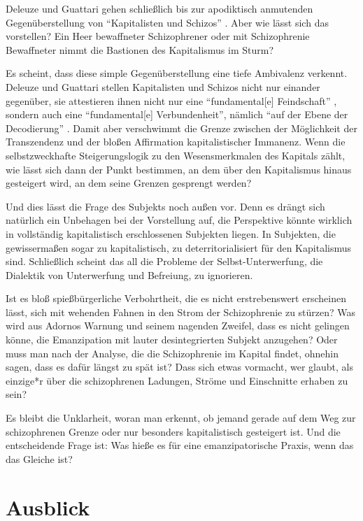 \documentclass[12pt,
               paper=a4,
               twoside=false,
               onehalfspacing,
               bibliography=totoc,
               toc=graduated,
               ]{scrartcl}
\newcommand{\pc}[2]{\parencite[#1]{#2}}
\newcommand{\dg}{Deleuze und Guattari\xspace}
\begin{document}
\dg gehen schließlich bis zur apodiktisch anmutenden Gegenüberstellung
von "`Kapitalisten und Schizos"' \pc{328}{ao}. Aber wie lässt sich das
vorstellen? Ein Heer bewaffneter Schizophrener oder mit Schizophrenie
Bewaffneter nimmt die Bastionen des Kapitalismus im Sturm?

Es scheint, dass diese simple Gegenüberstellung eine tiefe Ambivalenz
verkennt. \dg stellen Kapitalisten und Schizos nicht nur einander
gegenüber, sie attestieren ihnen nicht nur eine "`fundamental[e]
Feindschaft"' \pc{328}{ao}, sondern auch eine "`fundamental[e]
Verbundenheit"', nämlich "`auf der Ebene der Decodierung"'
\pc{328}{ao}. Damit aber verschwimmt die Grenze zwischen der
Möglichkeit der Transzendenz und der bloßen Affirmation
kapitalistischer Immanenz.
Wenn die selbstzweckhafte Steigerungslogik zu den Wesensmerkmalen des
Kapitals zählt, wie lässt sich dann der Punkt bestimmen, an dem über
den Kapitalismus hinaus gesteigert wird, an dem seine Grenzen
gesprengt werden?

Und dies lässt die Frage des Subjekts noch außen vor. Denn es drängt
sich natürlich ein Unbehagen bei der Vorstellung auf, die Perspektive
könnte wirklich in vollständig kapitalistisch erschlossenen Subjekten
liegen. In Subjekten, die gewissermaßen sogar zu kapitalistisch, zu
deterritorialisiert für den Kapitalismus sind. Schließlich scheint das
all die Probleme der Selbst-Unterwerfung, die Dialektik von
Unterwerfung und Befreiung, zu ignorieren.

Ist es bloß spießbürgerliche Verbohrtheit, die es nicht erstrebenswert
erscheinen lässt, sich mit wehenden Fahnen in den Strom der
Schizophrenie zu stürzen? Was wird aus Adornos Warnung und seinem
nagenden Zweifel, dass es nicht gelingen könne, die Emanzipation mit
lauter desintegrierten Subjekt anzugehen? Oder muss man nach der
Analyse, die die Schizophrenie im Kapital findet, ohnehin sagen, dass
es dafür längst zu spät ist? Dass sich etwas vormacht, wer glaubt, als
einzige*r über die schizophrenen Ladungen, Ströme und Einschnitte
erhaben zu sein?

Es bleibt die Unklarheit, woran man erkennt, ob jemand gerade auf dem
Weg zur schizophrenen Grenze oder nur besonders kapitalistisch
gesteigert ist. Und die entscheidende Frage ist: Was hieße es für eine
emanzipatorische Praxis, wenn das das Gleiche ist?



\section{Ausblick}
\end{document}
